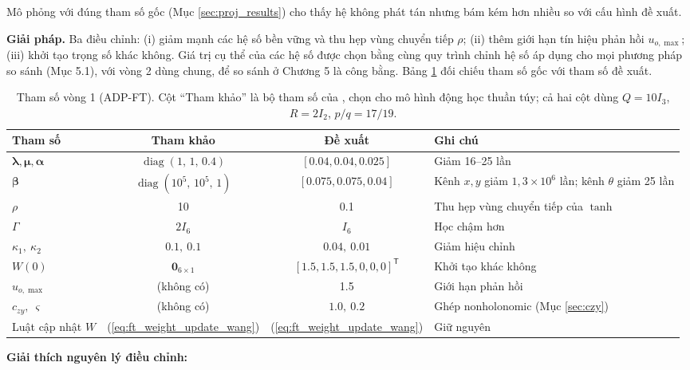 \documentclass[12pt,a4paper]{article}
\newcommand{\T}{\mathsf{T}}
\DeclareMathOperator{\diag}{diag}
\begin{document}
Mô phỏng với đúng tham số gốc (Mục \ref{sec:proj_results}) cho thấy hệ không phát tán nhưng bám kém hơn nhiều so với cấu hình đề xuất.

\textbf{Giải pháp.} Ba điều chỉnh: (i) giảm mạnh các hệ số bền vững và thu hẹp vùng chuyển tiếp $\rho$; (ii) thêm giới hạn tín hiệu phản hồi $u_{o,\max}$; (iii) khởi tạo trọng số khác không. Giá trị cụ thể của các hệ số được chọn bằng cùng quy trình chỉnh hệ số áp dụng cho mọi phương pháp so sánh (Mục 5.1), với vòng 2 dùng chung, để so sánh ở Chương 5 là công bằng. Bảng \ref{tab:ft_tuning} đối chiếu tham số gốc với tham số đề xuất.

\begin{table}[H]
\centering
\caption{Tham số vòng 1 (ADP-FT). Cột ``Tham khảo'' là bộ tham số của \cite{Wang2025}, chọn cho mô hình động học thuần túy; cả hai cột dùng $Q = 10I_3$, $R = 2I_2$, $p/q = 17/19$.}
\label{tab:ft_tuning}
\small
\begin{tabular}{lcc>{\raggedright\arraybackslash}p{4.2cm}}
\toprule
\textbf{Tham số} & \textbf{Tham khảo} & \textbf{Đề xuất} & \textbf{Ghi chú} \\
\midrule
$\bm{\lambda}, \bm{\mu}, \bm{\alpha}$ & $\diag(1,\, 1,\, 0.4)$ & $[0.04, 0.04, 0.025]$ & Giảm 16--25 lần \\
$\bm{\beta}$ & $\diag(10^5,\, 10^5,\, 1)$ & $[0.075, 0.075, 0.04]$ & Kênh $x, y$ giảm $1{,}3\times 10^6$ lần; kênh $\theta$ giảm 25 lần \\
$\rho$ & 10 & 0.1 & Thu hẹp vùng chuyển tiếp của $\tanh$ \\
$\Gamma$ & $2 I_6$ & $I_6$ & Học chậm hơn \\
$\kappa_1,\ \kappa_2$ & $0.1,\ 0.1$ & $0.04,\ 0.01$ & Giảm hiệu chỉnh \\
$W(0)$ & $\bm{0}_{6\times 1}$ & $[1.5, 1.5, 1.5, 0, 0, 0]^\T$ & Khởi tạo khác không \\
$u_{o,\max}$ & (không có) & 1.5 & Giới hạn phản hồi \\
$c_{zy},\ \varsigma$ & (không có) & $1.0,\ 0.2$ & Ghép nonholonomic (Mục \ref{sec:czy}) \\
Luật cập nhật $W$ & (\ref{eq:ft_weight_update_wang}) & (\ref{eq:ft_weight_update_wang}) & Giữ nguyên \\
\bottomrule
\end{tabular}
\end{table}

\textbf{Giải thích nguyên lý điều chỉnh:}
\end{document}
